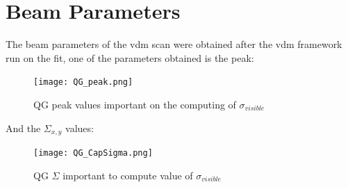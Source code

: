 \section{Beam Parameters}

The beam parameters of the vdm scan were obtained after the vdm framework run on the fit, one of the parameters obtained is the peak:

\begin{figure}[h]
    \centering
    \texttt{[image: QG\_peak.png]}
    \caption{QG peak values important on the computing of $\sigma_{visible}$}
    \label{fig:QGpeak}
\end{figure}

And the $\Sigma_{x, y}$ values: 

\begin{figure}[h]
    \centering
    \texttt{[image: QG\_CapSigma.png]}
    \caption{QG $\Sigma$ important to compute value of $\sigma_{visible}$}
    \label{fig:QGcapsigma}
\end{figure}




